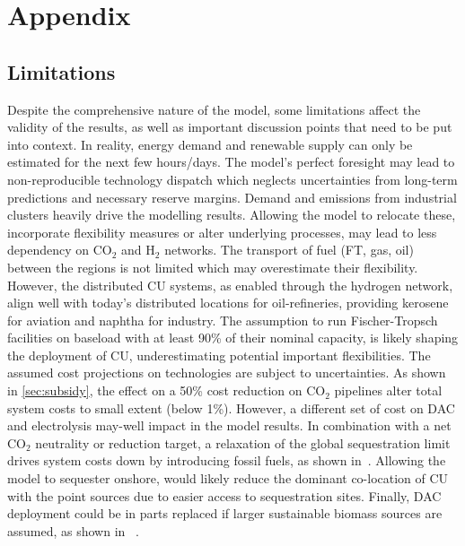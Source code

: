 \documentclass[twocolumn]{article}
\newcommand{\carbon}{CO$_2$}
\newcommand{\hydrogen}{H$_2$}
\begin{document}
\onecolumn %

\section{Appendix}


\subsection{Limitations}
\label{sec:limitations}
Despite the comprehensive nature of the model, some limitations affect the validity of the results, as well as important discussion points that need to be put into context.
In reality, energy demand and renewable supply can only be estimated for the next few hours/days. The model's perfect foresight may lead to non-reproducible technology dispatch which neglects uncertainties from long-term predictions and necessary reserve margins.
Demand and emissions from industrial clusters heavily drive the modelling results. Allowing the model to relocate these, incorporate flexibility measures or alter underlying processes, may lead to less dependency on \carbon{} and \hydrogen{} networks.
The transport of fuel (FT, gas, oil) between the regions is not limited which may overestimate their flexibility. However, the distributed CU systems, as enabled through the hydrogen network, align well with today's distributed locations for oil-refineries, providing kerosene for aviation and naphtha for industry. The assumption to run Fischer-Tropsch facilities on baseload with at least 90\% of their nominal capacity, is likely shaping the deployment of CU, underestimating potential important flexibilities.
The assumed cost projections on technologies are subject to uncertainties. As shown in \ref{sec:subsidy}, the effect on a 50\% cost reduction on \carbon{} pipelines alter total system costs to small extent (below 1\%). However, a different set of cost on DAC and electrolysis may-well impact in the model results.
In combination with a net \carbon{} neutrality or reduction target, a relaxation of the global sequestration limit drives system costs down by introducing fossil fuels, as shown in~\cite{hofmannDesigningCO2Network2023}. Allowing the model to sequester onshore, would likely reduce the dominant co-location of CU with the point sources due to easier access to sequestration sites.
Finally, DAC deployment could be in parts replaced if larger sustainable biomass sources are assumed, as shown in ~\cite{lauerCrucialRoleBioenergy2023}.
\end{document}
